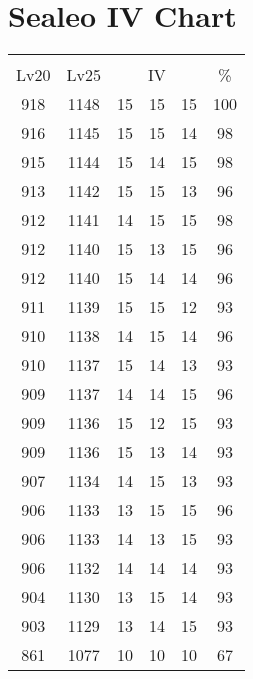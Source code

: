 \documentclass{article}%
\begin{document}
%
\normalsize%
\section{Sealeo IV Chart}%
\label{sec:Sealeo IV Chart}%
\renewcommand{\arraystretch}{1.5}%
\begin{tabular}{|c|c|c|c|c|c|}%
\hline%
\multicolumn{6}{|c|}{\textcolor{white}{ 
\linebreak{Sealeo}
}%
\cellcolor{black}}\\%
\multicolumn{1}{|c}{Lv20}&\multicolumn{1}{c|}{Lv25}&\multicolumn{3}{c|}{IV}&\multicolumn{1}{|c|}{\%}\\%
\hline%
\rowcolor{color100}%
918&1148&15&15&15&100\\%
\hline%
\rowcolor{color98}%
916&1145&15&15&14&98\\%
\hline%
\rowcolor{color98}%
915&1144&15&14&15&98\\%
\hline%
\rowcolor{color96}%
913&1142&15&15&13&96\\%
\hline%
\rowcolor{color98}%
912&1141&14&15&15&98\\%
\hline%
\rowcolor{color96}%
912&1140&15&13&15&96\\%
\hline%
\rowcolor{color96}%
912&1140&15&14&14&96\\%
\hline%
\rowcolor{color93}%
911&1139&15&15&12&93\\%
\hline%
\rowcolor{color96}%
910&1138&14&15&14&96\\%
\hline%
\rowcolor{color93}%
910&1137&15&14&13&93\\%
\hline%
\rowcolor{color96}%
909&1137&14&14&15&96\\%
\hline%
\rowcolor{color93}%
909&1136&15&12&15&93\\%
\hline%
\rowcolor{color93}%
909&1136&15&13&14&93\\%
\hline%
\rowcolor{color93}%
907&1134&14&15&13&93\\%
\hline%
\rowcolor{color96}%
906&1133&13&15&15&96\\%
\hline%
\rowcolor{color93}%
906&1133&14&13&15&93\\%
\hline%
\rowcolor{color93}%
906&1132&14&14&14&93\\%
\hline%
\rowcolor{color93}%
904&1130&13&15&14&93\\%
\hline%
\rowcolor{color93}%
903&1129&13&14&15&93\\%
\hline%
\rowcolor{color91}%
861&1077&10&10&10&67\\%
\end{tabular}

%
\end{document}
